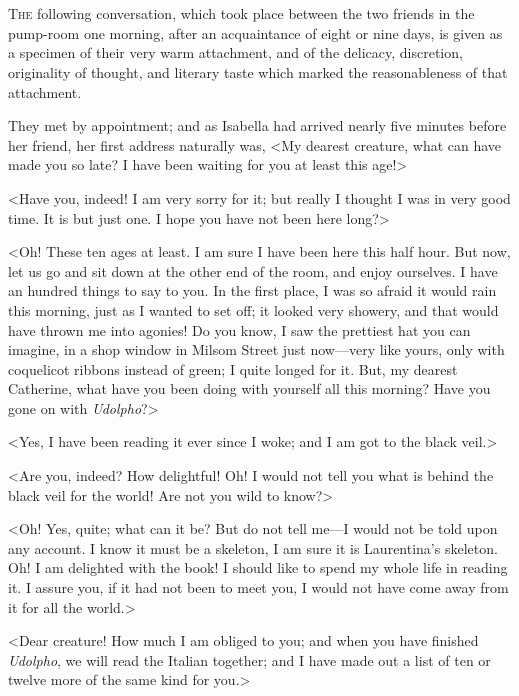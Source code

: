 \chapter[Chapter \thechapter]{} 

 \lettrine{T}{he} following conversation, which took place between the two friends in the pump-room one morning, after an acquaintance of eight or nine days, is given as a specimen of their very warm attachment, and of the delicacy, discretion, originality of thought, and literary taste which marked the reasonableness of that attachment. 

 They met by appointment; and as Isabella had arrived nearly five minutes before her friend, her first address naturally was, <My dearest creature, what can have made you so late? I have been waiting for you at least this age!> 

 <Have you, indeed! I am very sorry for it; but really I thought I was in very good time. It is but just one. I hope you have not been here long?> 

 <Oh! These ten ages at least. I am sure I have been here this half hour. But now, let us go and sit down at the other end of the room, and enjoy ourselves. I have an hundred things to say to you. In the first place, I was so afraid it would rain this morning, just as I wanted to set off; it looked very showery, and that would have thrown me into agonies! Do you know, I saw the prettiest hat you can imagine, in a shop window in Milsom Street just now—very like yours, only with coquelicot ribbons instead of green; I quite longed for it. But, my dearest Catherine, what have you been doing with yourself all this morning? Have you gone on with \textit{Udolpho}?> 

 <Yes, I have been reading it ever since I woke; and I am got to the black veil.> 

 <Are you, indeed? How delightful! Oh! I would not tell you what is behind the black veil for the world! Are not you wild to know?> 

 <Oh! Yes, quite; what can it be? But do not tell me—I would not be told upon any account. I know it must be a skeleton, I am sure it is Laurentina's skeleton. Oh! I am delighted with the book! I should like to spend my whole life in reading it. I assure you, if it had not been to meet you, I would not have come away from it for all the world.> 

 <Dear creature! How much I am obliged to you; and when you have finished \textit{Udolpho}, we will read the Italian together; and I have made out a list of ten or twelve more of the same kind for you.> 

